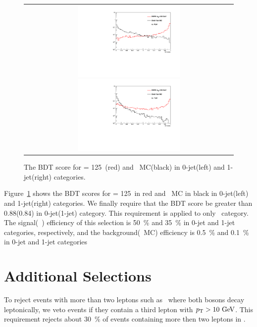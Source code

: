 \begin{figure}[htp] 
\centering
\begin{tabular}{c} 
\includegraphics[width=0.5\textwidth]{figures/dymva_0j.pdf} 
\includegraphics[width=0.5\textwidth]{figures/dymva_1j.pdf} 
\end{tabular} 
\caption{The BDT score for \mHi = 125~\GeV(red) and \dyll\ MC(black)
in 0-jet(left) and 1-jet(right) categories.} 
\label{fig:dymva} 
\end{figure} 

Figure~\ref{fig:dymva} shows the BDT scores for \mHi = 125~\GeV in red 
and \dyll\ MC in black in 0-jet(left) and 1-jet(right) categories. We finally require 
that the BDT score be greater than 0.88(0.84) in 0-jet(1-jet) category. 
This requirement is applied to only \SF\ category. 
The signal(~\GeV) efficiency of this selection is 50~\% and 35~\% 
in 0-jet and 1-jet categories, respectively, 
and the background(\dyll\ MC) efficiency is 0.5~\% and 0.1~\% in 0-jet and 1-jet categories

\section{Additional Selections}

To reject events with more than two leptons such as \vv\ where both bosons decay leptonically, 
we veto events if they contain a third lepton with $p_\mathrm{T}>10~\mathrm{Ge\kern -0.1em V}$. 
This requirement rejects about 30~\% of events containing more then two leptons in \vv. 

